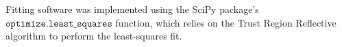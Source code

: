 Fitting software was implemented using the SciPy package's
$\mathtt{optimize.least\_squares}$ function,
which relies on the Trust Region Reflective algorithm 
to perform the least-squares fit.







